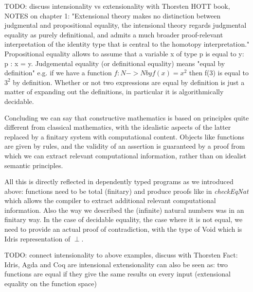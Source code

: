 TODO: discuss intensionality vs extensionality with Thorsten
HOTT book, NOTES on chapter 1: "Extensional theory makes no distinction between judgmental and propositional equality, the intensional theory regards judgmental equality as purely definitional, and admits a much broader proof-relevant interpretation of the identity type that is central to the homotopy interpretation."
Propositional equality allows to assume that a variable x of type p is equal to y: p : x = y.
Judgemental equality (or definitional equality) means "equal by definition" e.g. if we have a function $f : N -> N by f(x) = x^2$ then f(3) is equal to $3^2$ by definition. Whether or not two expressions are equal by definition is just a matter of expanding out the definitions, in particular it is algorithmically decidable.

Concluding we can say that constructive mathematics is based on principles quite different from classical mathematics, with the idealistic aspects of the latter replaced by a finitary system with computational content. Objects like functions are given by rules, and the validity of an assertion is guaranteed by a proof from which we can extract relevant computational information, rather than on idealist semantic principles. 

All this is directly reflected in dependently typed programs as we introduced above: functions need to be total (finitary) and produce proofs like in \textit{checkEqNat} which allows the compiler to extract additional relevant computational information. Also the way we described the (infinite) natural numbers was in an finitary way. In the case of decidable equality, the case where it is not equal, we need to provide an actual proof of contradiction, with the type of Void which is Idris representation of $\perp$. 

TODO: connect intensionality to above examples, discuss with Thorsten
Fact: Idris, Agda and Coq are intensional
extensionality can also be seen as: two functions are equal if they give the same results on every input (extensional equality on the function space)